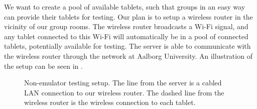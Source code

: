 We want to create a pool of available tablets, such that groups in an easy way can provide their tablets for testing. Our plan is to setup a wireless router in the vicinity of our group rooms. The wireless router broadcasts a Wi-Fi signal, and any tablet connected to this Wi-Fi will automatically be in a pool of connected tablets, potentially available for testing. The server is able to communicate with the wireless router through the network at Aalborg University. An illustration of the setup can be seen in .


\begin{figure}%
  \centering
  \caption[Some short text]{Non-emulator testing setup. The line from the server is a cabled LAN connection to our wireless router. The dashed line from the wireless router is the wireless connection to each tablet.}%
  \label{fig:wireless_router}%
\end{figure}

